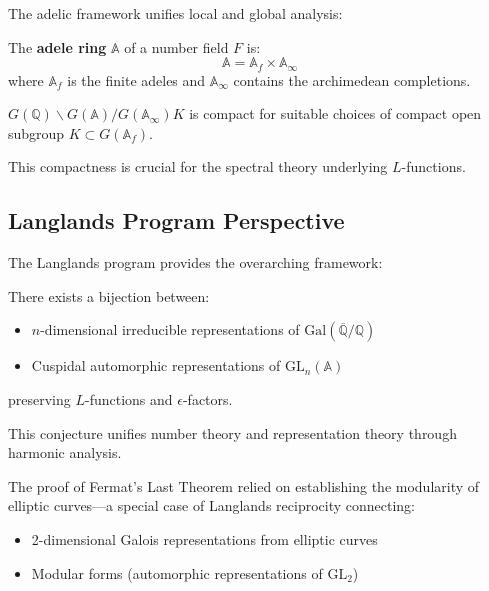 The adelic framework unifies local and global analysis:

\begin{definition}
The \textbf{adele ring} $\mathbb{A}$ of a number field $F$ is:
$$\mathbb{A} = \mathbb{A}_f \times \mathbb{A}_{\infty}$$
where $\mathbb{A}_f$ is the finite adeles and $\mathbb{A}_{\infty}$ contains the archimedean completions.
\end{definition}

\begin{theorem}
$G(\mathbb{Q}) \backslash G(\mathbb{A})/G(\mathbb{A}_{\infty}) K$ is compact for suitable choices of compact open subgroup $K \subset G(\mathbb{A}_f)$.
\end{theorem}

This compactness is crucial for the spectral theory underlying $L$-functions.

\subsection{Langlands Program Perspective}

The Langlands program provides the overarching framework:

\begin{conjecture}
There exists a bijection between:
\begin{itemize}
\item $n$-dimensional irreducible representations of $\text{Gal}(\overline{\mathbb{Q}}/\mathbb{Q})$
\item Cuspidal automorphic representations of $\text{GL}_n(\mathbb{A})$
\end{itemize}
preserving $L$-functions and $\epsilon$-factors.
\end{conjecture}

This conjecture unifies number theory and representation theory through harmonic analysis.

\begin{example}
The proof of Fermat's Last Theorem relied on establishing the modularity of elliptic curves—a special case of Langlands reciprocity connecting:
\begin{itemize}
\item 2-dimensional Galois representations from elliptic curves
\item Modular forms (automorphic representations of $\text{GL}_2$)
\end{itemize}
\end{example}

